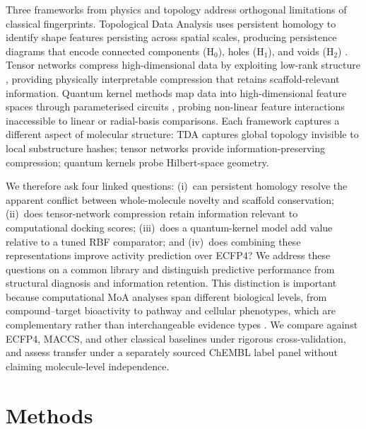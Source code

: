 \documentclass[11pt,a4paper]{article}
\begin{document}
Three frameworks from physics and topology address orthogonal limitations of classical fingerprints. Topological Data Analysis uses persistent homology to identify shape features persisting across spatial scales, producing persistence diagrams that encode connected components (H$_0$), holes (H$_1$), and voids (H$_2$) \citep{tda_review_2025,tda_binding_affinity_2026,tda_pretraining_2026}. Tensor networks compress high-dimensional data by exploiting low-rank structure \citep{tensornet_2023,tn_efficient_2026}, providing physically interpretable compression that retains scaffold-relevant information. Quantum kernel methods map data into high-dimensional feature spaces through parameterised circuits \citep{qml_review_2026,pqc_chemistry_2026}, probing non-linear feature interactions inaccessible to linear or radial-basis comparisons. Each framework captures a different aspect of molecular structure: TDA captures global topology invisible to local substructure hashes; tensor networks provide information-preserving compression; quantum kernels probe Hilbert-space geometry.

We therefore ask four linked questions: (i)~can persistent homology resolve the apparent conflict between whole-molecule novelty and scaffold conservation; (ii)~does tensor-network compression retain information relevant to computational docking scores; (iii)~does a quantum-kernel model add value relative to a tuned RBF comparator; and (iv)~does combining these representations improve activity prediction over ECFP4? We address these questions on a common library and distinguish predictive performance from structural diagnosis and information retention. This distinction is important because computational MoA analyses span different biological levels, from compound--target bioactivity to pathway and cellular phenotypes, which are complementary rather than interchangeable evidence types \citep{Trapotsi2022MoA}. We compare against ECFP4, MACCS, and other classical baselines under rigorous cross-validation, and assess transfer under a separately sourced ChEMBL label panel without claiming molecule-level independence.


\section{Methods}
\end{document}
